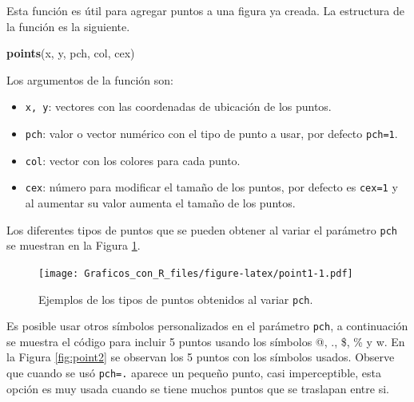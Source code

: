 \documentclass[10pt,]{krantz}
\makeatletter
\newenvironment{Shaded}{\begin{snugshade}}{\end{snugshade}}
\newcommand{\KeywordTok}[1]{\textcolor[rgb]{0.13,0.29,0.53}{\textbf{#1}}}
\newcommand{\NormalTok}[1]{#1}
\providecommand{\tightlist}{%
  \setlength{\itemsep}{0pt}\setlength{\parskip}{0pt}}
\newenvironment{kframe}{%
\medskip{}
\setlength{\fboxsep}{.8em}
 \def\at@end@of@kframe{}%
 \ifinner\ifhmode%
  \def\at@end@of@kframe{\end{minipage}}%
  \begin{minipage}{\columnwidth}%
 \fi\fi%
 \def\FrameCommand##1{\hskip\@totalleftmargin \hskip-\fboxsep
 \colorbox{shadecolor}{##1}\hskip-\fboxsep
     \hskip-\linewidth \hskip-\@totalleftmargin \hskip\columnwidth}%
 \MakeFramed {\advance\hsize-\width
   \@totalleftmargin\z@ \linewidth\hsize
   \@setminipage}}%
 {\par\unskip\endMakeFramed%
 \at@end@of@kframe}
\renewenvironment{Shaded}{\begin{kframe}}{\end{kframe}}
\makeatother
\begin{document}
Esta función es útil para agregar puntos a una figura ya creada. La
estructura de la función es la siguiente.

\begin{Shaded}
\begin{Highlighting}[]
\KeywordTok{points}\NormalTok{(x, y, pch, col, cex)}
\end{Highlighting}
\end{Shaded}

Los argumentos de la función son:

\begin{itemize}
\tightlist
\item
  \texttt{x,\ y}: vectores con las coordenadas de ubicación de los
  puntos.
\item
  \texttt{pch}: valor o vector numérico con el tipo de punto a usar, por
  defecto \texttt{pch=1}.
\item
  \texttt{col}: vector con los colores para cada punto.
\item
  \texttt{cex}: número para modificar el tamaño de los puntos, por
  defecto es \texttt{cex=1} y al aumentar su valor aumenta el tamaño de
  los puntos.
\end{itemize}

Los diferentes tipos de puntos que se pueden obtener al variar el
parámetro \texttt{pch} se muestran en la Figura \ref{fig:point1}.

\begin{figure}
\centering
\texttt{[image: Graficos\_con\_R\_files/figure-latex/point1-1.pdf]}
\caption{\label{fig:point1}Ejemplos de los tipos de puntos obtenidos al
variar \texttt{pch}.}
\end{figure}

Es posible usar otros símbolos personalizados en el parámetro
\texttt{pch}, a continuación se muestra el código para incluir 5 puntos
usando los símbolos @, ., \$, \% y w. En la Figura \ref{fig:point2} se
observan los 5 puntos con los símbolos usados. Observe que cuando se usó
\texttt{pch=\textquotesingle{}.\textquotesingle{}} aparece un pequeño
punto, casi imperceptible, esta opción es muy usada cuando se tiene
muchos puntos que se traslapan entre si.
\end{document}

